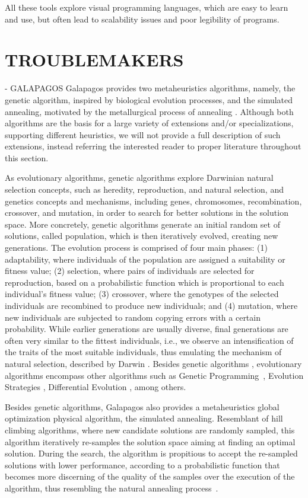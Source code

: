 All these tools explore visual programming languages, which are easy to learn and use, but often lead to scalability issues and poor legibility of programs. 


\section{TROUBLEMAKERS}
- GALAPAGOS
Galapagos provides two metaheuristics algorithms, namely, the genetic algorithm, inspired by biological evolution processes, and the simulated annealing, motivated by the metallurgical process of annealing \cite{Brownlee2011}. Although both algorithms are the basis for a large variety of extensions and/or specializations, supporting different heuristics, we will not provide a full description of such extensions, instead referring the interested reader to proper literature throughout this section. 

As evolutionary algorithms, genetic algorithms explore Darwinian natural selection concepts, such as heredity, reproduction, and natural selection, and genetics concepts and mechanisms, including genes, chromosomes, recombination, crossover, and mutation, in order to search for better solutions in the solution space. More concretely, genetic algorithms generate an initial random set of solutions, called population, which is then iteratively evolved, creating new generations. The evolution process is comprised of four main phases: (1) adaptability, where individuals of the population are assigned a suitability or fitness value; (2) selection, where pairs of individuals are selected for reproduction, based on a probabilistic function which is proportional to each individual's fitness value; (3) crossover, where the genotypes of the selected individuals are recombined to produce new individuals; and (4) mutation, where new individuals are subjected to random copying errors with a certain probability. While earlier generations are usually diverse, final generations are often very similar to the fittest individuals, i.e., we observe an intensification of the traits of the most suitable individuals, thus emulating the mechanism of natural selection, described by Darwin \cite{Brownlee2011}. Besides genetic algorithms \cite{Golberg1989,Holland1992}, evolutionary algorithms encompass other algorithms such as Genetic Programming~\cite{Koza1992}, Evolution Strategies \cite{Schwefel1981}, Differential Evolution \cite{Storn1997}, among others. 

Besides genetic algorithms, Galapagos also provides a metaheuristics global optimization physical algorithm, the simulated annealing. Resemblant of hill climbing algorithms, where new candidate solutions are randomly sampled, this algorithm iteratively re-samples the solution space aiming at finding an optimal solution. During the search, the algorithm is propitious to accept the re-sampled solutions with lower performance, according to a probabilistic function that becomes more discerning of the quality of the samples over the execution of the algorithm, thus resembling the natural annealing process~\cite{Brownlee2011}. 


